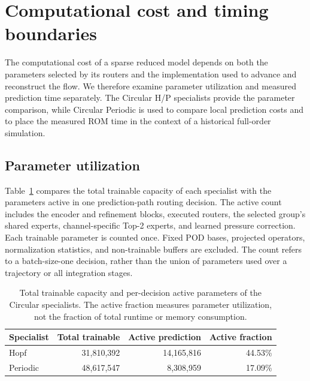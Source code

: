 \section{Computational cost and timing boundaries}
\label{app:parameter_counts}

The computational cost of a sparse reduced model depends on both the
parameters selected by its routers and the implementation used to
advance and reconstruct the flow. We therefore examine parameter
utilization and measured prediction time separately. The Circular H/P
specialists provide the parameter comparison, while Circular Periodic
is used to compare local prediction costs and to place the measured
ROM time in the context of a historical full-order simulation.

\subsection{Parameter utilization}

Table~\ref{tab:parameter_counts} compares the total trainable capacity
of each specialist with the parameters active in one prediction-path
routing decision. The active count includes the encoder and refinement
blocks, executed routers, the selected group's shared experts,
channel-specific Top-2 experts, and learned pressure correction.
Each trainable parameter is counted once. Fixed POD bases, projected
operators, normalization statistics, and non-trainable buffers are
excluded. The count refers to a batch-size-one decision, rather than
the union of parameters used over a trajectory or all integration stages.

\begin{table}[tbp]
\centering
\caption{Total trainable capacity and per-decision active parameters
of the Circular specialists. The active fraction measures parameter
utilization, not the fraction of total runtime or memory consumption.}
\label{tab:parameter_counts}
\begin{tabular}{@{}lrrr@{}}
\toprule
Specialist & Total trainable & Active prediction & Active fraction\\
\midrule
Hopf & 31,810,392 & 14,165,816 & 44.53\%\\
Periodic & 48,617,547 & 8,308,959 & 17.09\%\\
\bottomrule
\end{tabular}
\end{table}

